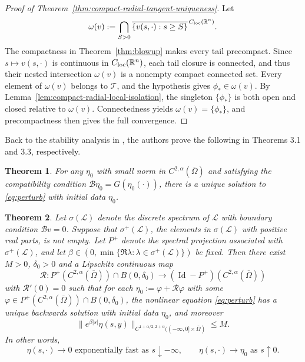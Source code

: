 \documentclass[11pt]{article}
\numberwithin{equation}{section}
\newtheorem{theorem}{Theorem}[section]
\theoremstyle{definition}
\newcommand{\RR}{\mathbb{R}}
\begin{document}
\begin{proof}[Proof of Theorem~\ref{thm:compact-radial-tangent-uniqueness}]
Let
\[
    \omega(v):=\bigcap_{S>0}
    \overline{\{v(s,\cdot):s\geq S\}}^{\,C_{\rm loc}(\RR^n)}.
\]
The compactness in Theorem~\ref{thm:blowup} makes every tail precompact.
Since $s\mapsto v(s,\cdot)$ is continuous in $C_{\rm loc}(\RR^n)$, each tail
closure is connected, and thus their nested intersection $\omega(v)$ is a
nonempty compact connected set. Every element of $\omega(v)$ belongs to
$\mathcal T$, and the hypothesis gives $\phi_*\in\omega(v)$. By
Lemma~\ref{lem:compact-radial-local-isolation}, the singleton $\{\phi_*\}$ is
both open and closed relative to $\omega(v)$. Connectedness yields
$\omega(v)=\{\phi_*\}$, and precompactness then gives the full convergence.
\end{proof}

Back to the stability analysis in \cite{stability}, the authors prove the following in Theorems 3.1 and 3.3, respectively.

\begin{theorem}
	For any $\eta_0$ with small norm in $C^{2,\alpha}(\overline{\Omega})$ and satisfying the compatibility condition $\mathscr{B} \eta_0 = G(\eta_0(\cdot))$, there is a unique solution to \eqref{eq:perturb} with initial data $\eta_0$.
\end{theorem}

\begin{theorem}
	Let $\sigma(\mathscr{L})$ denote the discrete spectrum of $\mathscr{L}$ with boundary condition $\mathscr{B}v=0$. Suppose that $\sigma^+(\mathscr{L})$, the elements in $\sigma(\mathscr{L})$ with positive real parts, is not empty.  Let $P^+$ denote the spectral projection associated with $\sigma^+(\mathscr{L})$, and let $\beta \in (0, \min \{ \Re \lambda: \lambda \in \sigma^+(\mathscr{L})\} )$ be fixed. Then there exist $M>0$, $\delta_0>0$ and a Lipschitz continuous map
    \[ \mathscr{R}: P^+(C^{2,\alpha}(\overline{\Omega})) \cap B(0,\delta_0) \to (\operatorname{Id}-P^+)(C^{2,\alpha}(\overline{\Omega})) \]
    with $\mathscr{R}'(0)=0$ such that for each $\eta_0 := \varphi+\mathscr{R}\varphi$ with some $\varphi \in P^+(C^{2,\alpha}(\overline{\Omega})) \cap B(0,\delta_0)$, the nonlinear equation \eqref{eq:perturb} has a unique backwards solution with initial data $\eta_0$, and moreover
    \begin{equation}\label{eq:expdecay}
        \|e^{\beta |s|} \eta(s,y) \|_{C^{1+\alpha/2, 2+\alpha}((-\infty,0] \times \overline{\Omega}) } \leq M. 
    \end{equation} 
    In other words,
    \begin{equation*}
        \eta(s,\cdot) \to 0 \text{ exponentially fast as } s\downarrow -\infty, \qquad \eta(s,\cdot) \to \eta_0 \text{ as } s\uparrow 0.
    \end{equation*} 
\end{theorem}
\end{document}
